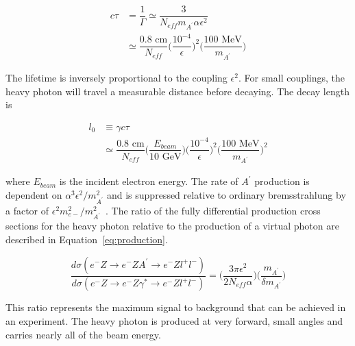 \begin{equation}
	\label{eq:propLife}
	\begin{split}
	c\tau &= \dfrac{1}{\Gamma}\simeq \dfrac{3}{N_{eff}m_{A^{\prime}}\alpha\epsilon^2}\\
	&\simeq \dfrac{0.8\textrm{ cm}}{N_{eff}}\Big({\dfrac{10^{-4}}{\epsilon}}\Big)^2\Big(\dfrac{100\textrm{ MeV}}{m_{A^{\prime}}}\Big)
	\end{split}
\end{equation}

The lifetime is inversely proportional to the coupling $\epsilon^2$. For small couplings, the heavy photon will travel a measurable distance before decaying. The decay length is 

\begin{equation}
	\label{eq:decayL}
	\begin{split}
	l_0 &\equiv \gamma c \tau \\
	&\simeq \dfrac{0.8\textrm{ cm}}{N_{eff}}\Big(\dfrac{E_{beam}}{10\textrm{ GeV}}\Big)\Big({\dfrac{10^{-4}}{\epsilon}}\Big)^2\Big(\dfrac{100\textrm{ MeV}}{m_{A^{\prime}}}\Big)^2
	\end{split}
\end{equation}

where $E_{beam}$ is the incident electron energy. The rate of $A^{\prime}$ production is dependent on $\alpha^3\epsilon^2/m_{A^{\prime}}^2$ and is suppressed relative to ordinary bremsstrahlung by a factor of $\epsilon^2m_{e-}^2/m_{A^{\prime}}^2$~\cite{bjorken_new_2009}. The ratio of the fully differential production cross sections for the heavy photon relative to the production of a virtual photon are described in Equation~\eqref{eq:production}.

\begin{equation}
	\label{eq:production}
	\dfrac{d\sigma(e^-Z\rightarrow e^-ZA^{\prime}\rightarrow e^-Zl^+l^-)}{d\sigma(e^-Z\rightarrow e^-Z\gamma^{\ast}\rightarrow e^-Zl^+l^-)} = \Big(\dfrac{3\pi\epsilon^2}{2N_{eff}\alpha}\Big) \Big(\dfrac{m_{A^{\prime}}}{\delta m_{A^{\prime}}}\Big)
\end{equation}

This ratio represents the maximum signal to background that can be achieved in an experiment. The heavy photon is produced at very forward, small angles and carries nearly all of the beam energy. \\

